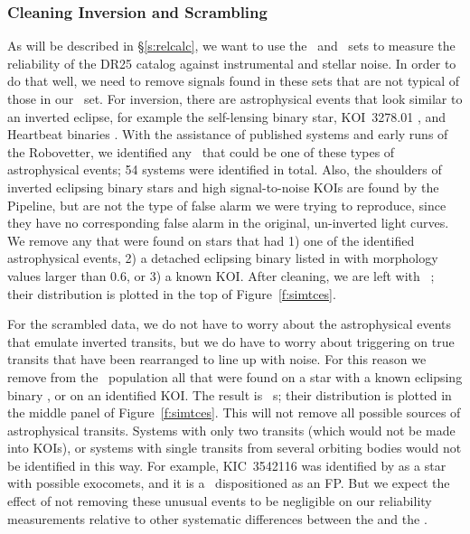 \subsubsection{Cleaning Inversion and Scrambling}
\label{s:clean}
As will be described in \S\ref{s:relcalc}, we want to use the \invtce\ and \scrtce\ sets to measure the reliability of the DR25 catalog against instrumental and stellar noise. In order to do that well, we need to remove signals found in these sets that are not typical of those in our \opstce\ set. For inversion, there are astrophysical events that look similar to an inverted eclipse, for example the self-lensing binary star, KOI~3278.01 \citep{Kruse2014}, and Heartbeat binaries \citep{Thompson2012}. With the assistance of published systems and early runs of the Robovetter, we identified any \invtce\ that could be one of these types of astrophysical events; 54 systems were identified in total. Also, the shoulders of inverted eclipsing binary stars and high signal-to-noise KOIs are found by the Pipeline, but are not the type of false alarm we were trying to reproduce, since they have no corresponding false alarm in the original, un-inverted light curves. We remove any  that were found on stars that had 1) one of the identified astrophysical events, 2) a detached eclipsing binary listed in \citet{Kirk2016} with morphology values larger than 0.6, or 3) a known KOI.  After cleaning, we are left with \ninvtces\ ; their distribution is plotted in the top of Figure~\ref{f:simtces}.

For the scrambled data, we do not have to worry about the astrophysical events that emulate inverted transits, but we do have to worry about triggering on true transits that have been rearranged to line up with noise. For this reason we remove from the \scrtce\ population all that were found on a star with a known eclipsing binary \citep{Kirk2016}, or on an identified KOI.  The result is \nscrtces\ \scrtce s; their distribution is plotted in the middle panel of Figure~\ref{f:simtces}. 
{\color{blue}This will not remove all possible sources of astrophysical transits. Systems with only two transits (which would not be made into KOIs), or systems with single transits from several orbiting bodies would not be identified in this way. For example, KIC~3542116 was identified by \citet{Rappaport2017} as a star with possible exocomets, and it is a \scrtce\ dispositioned as an FP.  But we expect the effect of not removing these unusual events to be negligible on our reliability measurements relative to other systematic differences between the  and the .
}

